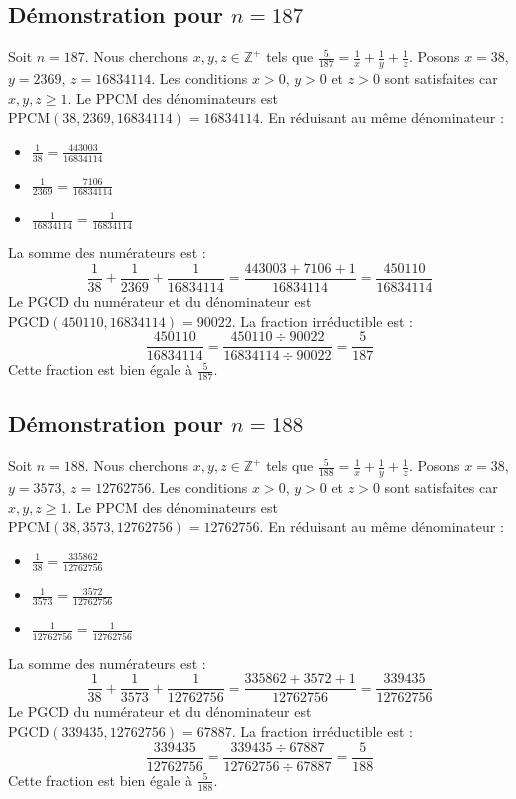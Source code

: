 \documentclass[11pt,a4paper]{article}
\begin{document}
\subsection{Démonstration pour $n = 187$}
Soit $n = 187$. Nous cherchons $x, y, z \in \mathbb{Z}^{+}$ tels que $\frac{5}{187} = \frac{1}{x} + \frac{1}{y} + \frac{1}{z}$.
Posons $x = 38$, $y = 2369$, $z = 16834114$.
Les conditions $x > 0$, $y > 0$ et $z > 0$ sont satisfaites car $x, y, z \geq 1$.
Le PPCM des dénominateurs est $\text{PPCM}(38, 2369, 16834114) = 16834114$.
En réduisant au même dénominateur :
\begin{itemize}
    \item $\frac{1}{38} = \frac{443003}{16834114}$
    \item $\frac{1}{2369} = \frac{7106}{16834114}$
    \item $\frac{1}{16834114} = \frac{1}{16834114}$
\end{itemize}
La somme des numérateurs est :
$$ \frac{1}{38} + \frac{1}{2369} + \frac{1}{16834114} = \frac{443003 + 7106 + 1}{16834114} = \frac{450110}{16834114} $$
Le PGCD du numérateur et du dénominateur est $\text{PGCD}(450110, 16834114) = 90022$.
La fraction irréductible est :
$$ \frac{450110}{16834114} = \frac{450110 \div 90022}{16834114 \div 90022} = \frac{5}{187} $$
Cette fraction est bien égale à $\frac{5}{187}$.

\subsection{Démonstration pour $n = 188$}
Soit $n = 188$. Nous cherchons $x, y, z \in \mathbb{Z}^{+}$ tels que $\frac{5}{188} = \frac{1}{x} + \frac{1}{y} + \frac{1}{z}$.
Posons $x = 38$, $y = 3573$, $z = 12762756$.
Les conditions $x > 0$, $y > 0$ et $z > 0$ sont satisfaites car $x, y, z \geq 1$.
Le PPCM des dénominateurs est $\text{PPCM}(38, 3573, 12762756) = 12762756$.
En réduisant au même dénominateur :
\begin{itemize}
    \item $\frac{1}{38} = \frac{335862}{12762756}$
    \item $\frac{1}{3573} = \frac{3572}{12762756}$
    \item $\frac{1}{12762756} = \frac{1}{12762756}$
\end{itemize}
La somme des numérateurs est :
$$ \frac{1}{38} + \frac{1}{3573} + \frac{1}{12762756} = \frac{335862 + 3572 + 1}{12762756} = \frac{339435}{12762756} $$
Le PGCD du numérateur et du dénominateur est $\text{PGCD}(339435, 12762756) = 67887$.
La fraction irréductible est :
$$ \frac{339435}{12762756} = \frac{339435 \div 67887}{12762756 \div 67887} = \frac{5}{188} $$
Cette fraction est bien égale à $\frac{5}{188}$.
\end{document}

